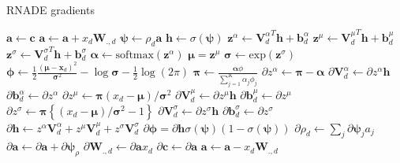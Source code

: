 \documentclass{article} %
\begin{document}
\begin{algorithm}
\caption{RNADE gradients}
\begin{algorithmic}%
\State $\mathbf{a} \gets \mathbf{c}$
	\State $\mathbf{a} \gets \mathbf{a} + x_{d}\mathbf{W}_{.,d} $
\EndFor
{}
\State $\boldsymbol{\psi} \gets \rho_{d} \mathbf a$
\State $\mathbf{h} \gets \sigma(\boldsymbol{\psi})$
\State $\mathbf{z}^{\alpha} \gets {\mathbf{V}^{\alpha}_{d}}^{T}\mathbf{h} + \mathbf{b}^{\alpha}_{d} $
\State $\mathbf{z}^{\mu} \gets {\mathbf{V}^{\mu}_{d}}^{T}\mathbf{h} + \mathbf{b}^{\mu}_{d} $
\State $\mathbf{z}^{\sigma} \gets {\mathbf{V}^{\sigma}_{d}}^{T}\mathbf{h} + \mathbf{b}^{\sigma}_{d} $
\State $\boldsymbol{\alpha} \gets \text{softmax}(\mathbf{z}^{\alpha})$
\State $\boldsymbol{\mu} = \mathbf{z}^{\mu}$
\State $\boldsymbol{\sigma} \gets \text{exp}(\mathbf{z}^{\sigma})$
\State $\boldsymbol{\phi} \gets \frac{1}{2} \frac{(\boldsymbol{\mu}-\mathbf{x}_d)^2}{\boldsymbol{\sigma}^2} - \log \boldsymbol{\sigma} - \frac{1}{2}\log(2\pi)$
\State $\boldsymbol{\pi} \gets \frac{\boldsymbol{\alpha}\phi}{\sum_{j=1}^{K} \alpha_j \phi_j}$
\State $\partial z^{\alpha} \gets \boldsymbol{\pi} - \boldsymbol{\alpha}$
\State $\partial \boldsymbol{V}^{\alpha}_{d} \gets \partial z^{\alpha} \mathbf{h}$
\State $\partial \mathbf{b}^{\alpha}_{d} \gets \partial z^{\alpha}$
\State $\partial z^{\mu} \gets \boldsymbol{\pi}(x_d - \boldsymbol{\mu})/\boldsymbol{\sigma}^2$
\State $\partial \boldsymbol{V}^{\mu}_{d} \gets \partial z^{\mu} \mathbf{h}$
\State $\partial \mathbf{b}^{\mu}_{d} \gets \partial z^{\mu}$
\State $\partial z^{\sigma} \gets \boldsymbol{\pi}\left\{ (x_d - \boldsymbol{\mu})/\boldsymbol{\sigma}^2 -1\right\}$
\State $\partial \boldsymbol{V}^{\sigma}_{d} \gets \partial z^{\sigma} \mathbf{h}$
\State $\partial \mathbf{b}^{\sigma}_{d} \gets \partial z^{\sigma}$
\State $\partial \mathbf{h} \gets z^{\alpha}\boldsymbol{V}^{\alpha}_{d} + z^{\mu}\boldsymbol{V}^{\mu}_{d} + z^{\sigma}\boldsymbol{V}^{\sigma}_{d}$
\State $\partial \boldsymbol{\phi} = \partial \mathbf{h}\sigma(\boldsymbol{\psi})(1-\sigma(\boldsymbol{\psi}))$
\State $\partial \rho_d \gets \sum_{j} \partial \boldsymbol{\psi}_ja_j$
\State $\partial \mathbf{a} \gets \partial \mathbf{a} + \partial \boldsymbol{\psi}_{\rho}$
\State $\partial \mathbf{W}_{.,d} \gets \partial \mathbf{a}x_d$
	\State $\partial \mathbf{c} \gets \partial \mathbf{a}$
\Else
	\State $\mathbf{a} \gets \mathbf{a} - x_d \mathbf{W}_{.,d}$
\EndIf
\EndFor
\end{algorithmic}
\end{algorithm}
\end{document}

